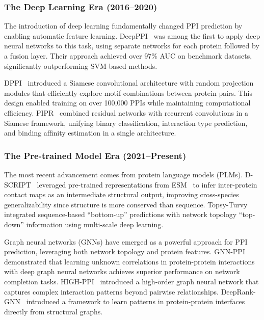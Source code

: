 \subsubsection{The Deep Learning Era (2016--2020)}

The introduction of deep learning fundamentally changed PPI prediction by enabling automatic feature learning. DeepPPI~\cite{chen2017deepppi} was among the first to apply deep neural networks to this task, using separate networks for each protein followed by a fusion layer. Their approach achieved over 97\% AUC on benchmark datasets, significantly outperforming SVM-based methods.

DPPI~\cite{hashemifar2018dppi} introduced a Siamese convolutional architecture with random projection modules that efficiently explore motif combinations between protein pairs. This design enabled training on over 100,000 PPIs while maintaining computational efficiency. PIPR~\cite{chen2019pipr} combined residual networks with recurrent convolutions in a Siamese framework, unifying binary classification, interaction type prediction, and binding affinity estimation in a single architecture.

\subsubsection{The Pre-trained Model Era (2021--Present)}

The most recent advancement comes from protein language models (PLMs). D-SCRIPT~\cite{sledzieski2021dscript} leveraged pre-trained representations from ESM~\cite{rives2021esm1b} to infer inter-protein contact maps as an intermediate structural output, improving cross-species generalizability since structure is more conserved than sequence. Topsy-Turvy~\cite{singh2022topsyturvy} integrated sequence-based ``bottom-up'' predictions with network topology ``top-down'' information using multi-scale deep learning.

Graph neural networks (GNNs) have emerged as a powerful approach for PPI prediction, leveraging both network topology and protein features. GNN-PPI~\cite{lv2021gnnppi} demonstrated that learning unknown correlations in protein-protein interactions with deep graph neural networks achieves superior performance on network completion tasks. HIGH-PPI~\cite{tang2021high} introduced a high-order graph neural network that captures complex interaction patterns beyond pairwise relationships. DeepRank-GNN~\cite{bryant2022deeprank} introduced a framework to learn patterns in protein-protein interfaces directly from structural graphs.

